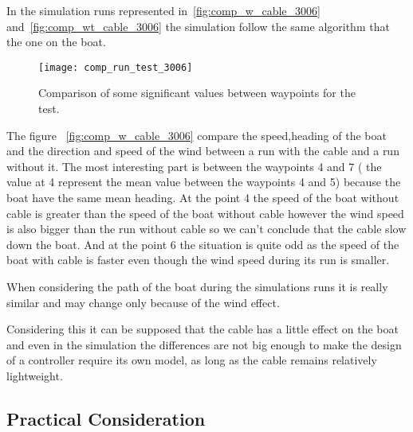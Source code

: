 In the simulation runs represented in~\ref{fig:comp_w_cable_3006} and~\ref{fig:comp_wt_cable_3006} the simulation follow the same algorithm that the one on the boat.

 \begin{figure}[H]
    \centering
    \texttt{[image: comp\_run\_test\_3006]}
    \caption{Comparison of some significant values between waypoints for the test.}
    \label{fig:comp_run_306}
\end{figure}

The figure ~\ref{fig:comp_w_cable_3006} compare the speed,heading of the boat and the direction and speed of the wind between a run with the cable and a run without it. The most interesting part is between the waypoints 4 and 7 ( the value at 4 represent the mean value between the waypoints 4 and 5)  because the boat have the same mean heading. At the point 4 the speed of the boat without cable is greater than the speed of the boat without cable however the wind speed is also bigger than the run without cable so we can't conclude that the cable slow down the boat. And at the point 6 the situation is quite odd as the speed of the boat with cable is faster 
even though the wind speed during its run is smaller.

When considering the path of the boat during the simulations runs it is really similar and may change only because of the wind effect.

Considering this it can be supposed that the cable has a little effect on the boat and even in the simulation the differences are not big enough to make the design of a controller require its own model, as long as the cable remains relatively lightweight.
	

\subsection*{Practical Consideration}

 